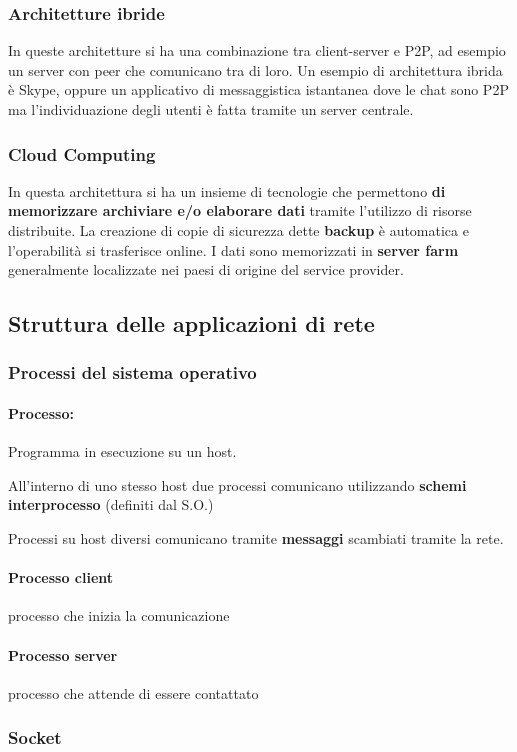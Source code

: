         \subsubsection{Architetture ibride}
            In queste architetture si ha una combinazione tra client-server e P2P, ad esempio un server con peer che comunicano tra di loro. Un esempio di architettura ibrida è Skype, oppure un applicativo di messaggistica istantanea dove le chat sono P2P ma l'individuazione degli utenti è fatta tramite un server centrale.
        \subsubsection{Cloud Computing}
            In questa architettura si ha un insieme di tecnologie che permettono \textbf{di memorizzare archiviare e/o elaborare dati} tramite l'utilizzo di risorse distribuite. La creazione di copie di sicurezza dette \textbf{backup} è automatica e l'operabilità si trasferisce online. I dati sono memorizzati in \textbf{server farm} generalmente localizzate nei paesi di origine del service provider.
    \subsection{Struttura delle applicazioni di rete}
        \subsubsection{Processi del sistema operativo}
            \paragraph{Processo:} Programma in esecuzione su un host.
            
            All'interno di uno stesso host due processi comunicano utilizzando \textbf{schemi interprocesso} (definiti dal S.O.)

            Processi su host diversi comunicano tramite \textbf{messaggi} scambiati tramite la rete.
            \paragraph{Processo client} processo che inizia la comunicazione
            \paragraph{Processo server} processo che attende di essere contattato
        \subsubsection{Socket}
